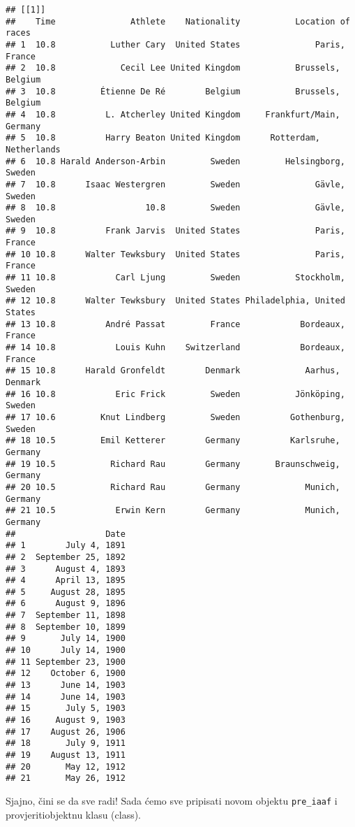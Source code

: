 \documentclass[
]{article}
\newenvironment{Shaded}{\begin{snugshade}}{\end{snugshade}}
\newcommand{\DataTypeTok}[1]{\textcolor[rgb]{0.13,0.29,0.53}{#1}}
\newcommand{\KeywordTok}[1]{\textcolor[rgb]{0.13,0.29,0.53}{\textbf{#1}}}
\newcommand{\NormalTok}[1]{#1}
\newcommand{\OperatorTok}[1]{\textcolor[rgb]{0.81,0.36,0.00}{\textbf{#1}}}
\newcommand{\OtherTok}[1]{\textcolor[rgb]{0.56,0.35,0.01}{#1}}
\newcommand{\StringTok}[1]{\textcolor[rgb]{0.31,0.60,0.02}{#1}}
\begin{document}
\begin{verbatim}
## [[1]]
##    Time               Athlete    Nationality           Location of races
## 1  10.8           Luther Cary  United States               Paris, France
## 2  10.8             Cecil Lee United Kingdom           Brussels, Belgium
## 3  10.8         Étienne De Ré        Belgium           Brussels, Belgium
## 4  10.8          L. Atcherley United Kingdom     Frankfurt/Main, Germany
## 5  10.8          Harry Beaton United Kingdom      Rotterdam, Netherlands
## 6  10.8 Harald Anderson-Arbin         Sweden         Helsingborg, Sweden
## 7  10.8      Isaac Westergren         Sweden               Gävle, Sweden
## 8  10.8                  10.8         Sweden               Gävle, Sweden
## 9  10.8          Frank Jarvis  United States               Paris, France
## 10 10.8      Walter Tewksbury  United States               Paris, France
## 11 10.8            Carl Ljung         Sweden           Stockholm, Sweden
## 12 10.8      Walter Tewksbury  United States Philadelphia, United States
## 13 10.8          André Passat         France            Bordeaux, France
## 14 10.8            Louis Kuhn    Switzerland            Bordeaux, France
## 15 10.8      Harald Gronfeldt        Denmark             Aarhus, Denmark
## 16 10.8            Eric Frick         Sweden           Jönköping, Sweden
## 17 10.6         Knut Lindberg         Sweden          Gothenburg, Sweden
## 18 10.5         Emil Ketterer        Germany          Karlsruhe, Germany
## 19 10.5           Richard Rau        Germany       Braunschweig, Germany
## 20 10.5           Richard Rau        Germany             Munich, Germany
## 21 10.5            Erwin Kern        Germany             Munich, Germany
##                  Date
## 1        July 4, 1891
## 2  September 25, 1892
## 3      August 4, 1893
## 4      April 13, 1895
## 5     August 28, 1895
## 6      August 9, 1896
## 7  September 11, 1898
## 8  September 10, 1899
## 9       July 14, 1900
## 10      July 14, 1900
## 11 September 23, 1900
## 12    October 6, 1900
## 13      June 14, 1903
## 14      June 14, 1903
## 15       July 5, 1903
## 16     August 9, 1903
## 17    August 26, 1906
## 18       July 9, 1911
## 19    August 13, 1911
## 20       May 12, 1912
## 21       May 26, 1912
\end{verbatim}

Sjajno, čini se da sve radi! Sada ćemo sve pripisati novom objektu
\texttt{pre\_iaaf} i provjeritiobjektnu klasu (class).

\begin{Shaded}
\end{Shaded}
\end{document}
